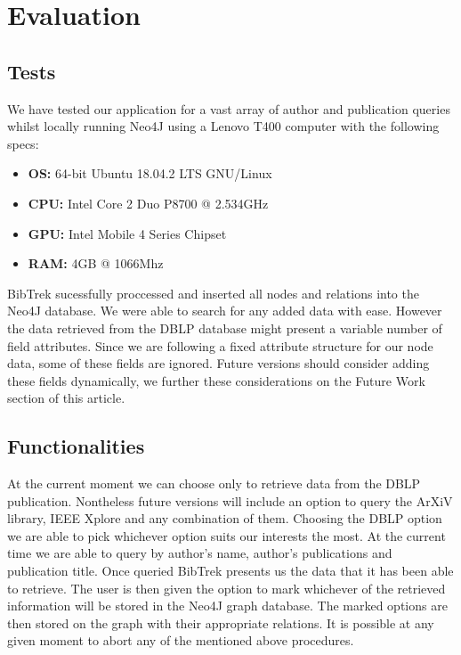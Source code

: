 \documentclass{article}
\begin{document}
\section{Evaluation}
\subsection{Tests}
We have tested our application for a vast array of author and publication queries whilst locally running Neo4J using a Lenovo T400 computer with the following specs:
\begin{itemize}
\item \textbf{OS:} 64-bit Ubuntu 18.04.2 LTS GNU/Linux 
\item \textbf{CPU:} Intel Core 2 Duo P8700 @ 2.534GHz 
\item \textbf{GPU:} Intel Mobile 4 Series Chipset
\item \textbf{RAM:} 4GB @ 1066Mhz 
\end{itemize}
BibTrek sucessfully proccessed and inserted all nodes and relations into the Neo4J database. We were able to search for any added data with ease. However the data retrieved from the DBLP database might present a variable number of field attributes. Since we are following a fixed attribute structure for our node data, some of these fields are ignored. Future versions should consider adding these fields dynamically, we further these considerations on the Future Work section of this article.
\subsection{Functionalities}
At the current moment we can choose only to retrieve data from the DBLP publication. Nontheless future versions will include an option to query the ArXiV library, IEEE Xplore and any combination of them. Choosing the DBLP option we are able to pick whichever option suits our interests the most. At the current time we are able to query by author's name, author's publications and publication title. Once queried BibTrek presents us the data that it has been able to retrieve. The user is then given the option to mark whichever of the retrieved information will be stored in the Neo4J graph database. The marked options are then stored on the graph with their appropriate relations. It is possible at any given moment to abort any of the mentioned above procedures.
\end{document}
